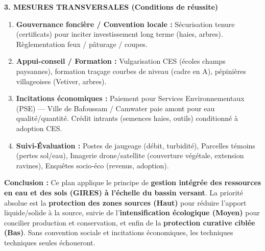 \documentclass[11pt]{article}
\begin{document}
\begin{exoresolu}
\begin{center}
\begin{tabularx}{\linewidth}{|l|X|X|X|}
    \end{tabularx}
    \end{center}
    \textbf{3. MESURES TRANSVERSALES (Conditions de réussite)}
    \begin{enumerate}
        \item \textbf{Gouvernance foncière / Convention locale :} Sécurisation tenure (certificats) pour inciter investissement long terme (haies, arbres). Règlementation feux / pâturage / coupes.
        \item \textbf{Appui-conseil / Formation :} Vulgarisation CES (écoles champs paysannes), formation traçage courbes de niveau (cadre en A), pépinières villageoises (Vetiver, arbres).
        \item \textbf{Incitations économiques :} Paiement pour Services Environnementaux (PSE) — Ville de Bafoussam / Camwater paie amont pour eau qualité/quantité. Crédit intrants (semences haies, outils) conditionné à adoption CES.
        \item \textbf{Suivi-Évaluation :} Postes de jaugeage (débit, turbidité), Parcelles témoins (pertes sol/eau), Imagerie drone/satellite (couverture végétale, extension ravines), Enquêtes socio-éco (revenus, adoption).
    \end{enumerate}
    \textbf{Conclusion :} Ce plan applique le principe de \textbf{gestion intégrée des ressources en eau et des sols (GIRES) à l'échelle du bassin versant}. La priorité absolue est la \textbf{protection des zones sources (Haut)} pour réduire l'apport liquide/solide à la source, suivie de l'\textbf{intensification écologique (Moyen)} pour concilier production et conservation, et enfin de la \textbf{protection curative ciblée (Bas)}. Sans convention sociale et incitations économiques, les techniques techniques seules échoueront.
\end{exoresolu}
\end{document}
